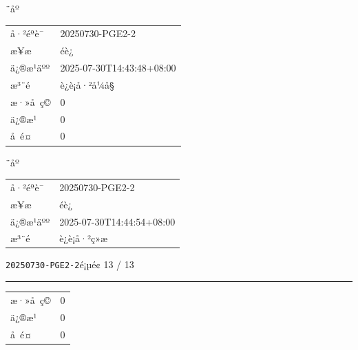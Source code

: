 \documentclass[UTF8,10pt,a4paper,fontset=fandol]{ctexart}
\newcommand{\fieldvalue}[1]{#1}
\begin{document}
\begin{center}
\begin{center}
¨åº

\begin{tabular}{@{}ll@{}}
å·²éªè¯ &
\fieldvalue{20250730-PGE2-2}\\
æ¥æ &
\fieldvalue{éè¿}\\
ä¿®æ¹äºº &
\fieldvalue{2025-07-30T14:43:48+08:00}\\
æ³¨é &
\fieldvalue{è¿è¡å·²å¼å§}\\
æ·»å ç© &
\fieldvalue{0}\\
ä¿®æ¹ &
\fieldvalue{0}\\
å é¤ &
\fieldvalue{0}\\
\end{tabular}

\medskip

¨åº

\begin{tabular}{@{}ll@{}}
å·²éªè¯ &
\fieldvalue{20250730-PGE2-2}\\
æ¥æ &
\fieldvalue{éè¿}\\
ä¿®æ¹äºº &
\fieldvalue{2025-07-30T14:44:54+08:00}\\
æ³¨é &
\fieldvalue{è¿è¡å·²ç»æ}\\
\end{tabular}

\newpage

\noindent\texttt{20250730-PGE2-2}\hfill é¡µé¢ 13 / 13

\vspace{0.3em}
\hrule
\vspace{1em}

\begin{tabular}{@{}ll@{}}
æ·»å ç© &
\fieldvalue{0}
\\
ä¿®æ¹ &
\fieldvalue{0}
\\
å é¤ &
\fieldvalue{0}
\end{tabular}


\end{center}
\end{center}
\end{document}
